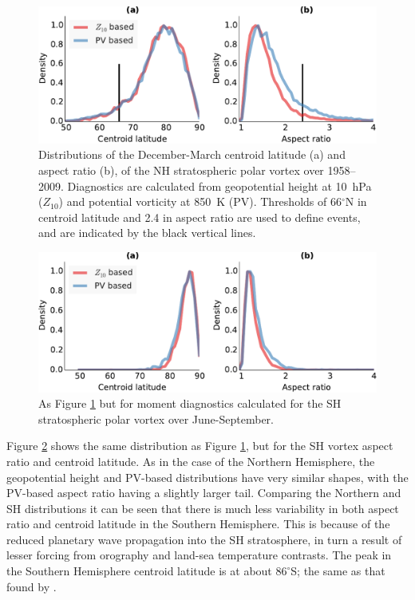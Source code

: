 \begin{figure}
  \centering
  \includegraphics[width=\textwidth]{figures/chapter-moments/moments_distribution_crop.pdf}
  \caption[NH distributions of $Z_{10}$ and PV-based moment
  diagnostics.]{Distributions of the December-March centroid latitude (a) and
    aspect ratio (b), of the NH stratospheric polar vortex over
    1958--2009. Diagnostics are calculated from geopotential height at 10~hPa
    ($Z_{10}$) and potential vorticity at 850~K (PV). Thresholds of
    66$^{\circ}$N in centroid latitude and 2.4 in aspect ratio are used to
    define events, and are indicated by the black vertical lines.}
  \label{fig:pv_z_moments_distribution}
\end{figure}

\begin{figure}
  \centering
  \includegraphics[width=\textwidth]{figures/chapter-moments/moments_distribution_crop_sh.pdf}
  \caption[SH distributions of $Z_{10}$ and PV-based moment diagnostics.]{As
    Figure \ref{fig:pv_z_moments_distribution} but for moment diagnostics
    calculated for the SH stratospheric polar vortex over
    June-September.}
  \label{fig:pv_z_moments_distribution_sh}
\end{figure}

Figure \ref{fig:pv_z_moments_distribution_sh} shows the same distribution as
Figure \ref{fig:pv_z_moments_distribution}, but for the SH vortex aspect ratio
and centroid latitude. As in the case of the Northern Hemisphere, the
geopotential height and PV-based distributions have very similar shapes, with
the PV-based aspect ratio having a slightly larger tail. Comparing the Northern
and SH distributions it can be seen that there is much less variability in both
aspect ratio and centroid latitude in the Southern Hemisphere. This is because
of the reduced planetary wave propagation into the SH stratosphere, in turn a
result of lesser forcing from orography and land-sea temperature contrasts. The
peak in the Southern Hemisphere centroid latitude is at about $86^{\circ}$S; the
same as that found by \citet{Waugh1999}.

